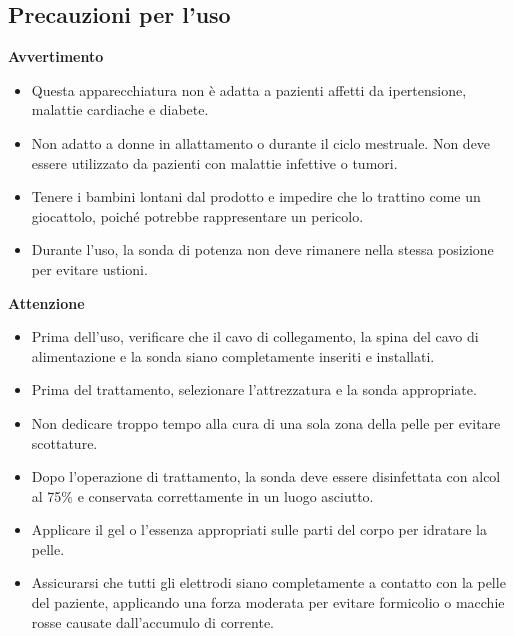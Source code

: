 \documentclass[a4paper]{article}
\begin{document}
\subsection{Precauzioni per l'uso}

\textbf{Avvertimento} \faExclamationTriangle

\begin{itemize}
	\item Questa apparecchiatura non è adatta a pazienti affetti da ipertensione, malattie cardiache e diabete.
	\item Non adatto a donne in allattamento o durante il ciclo mestruale. Non deve essere utilizzato da pazienti con malattie infettive o tumori.
	\item Tenere i bambini lontani dal prodotto e impedire che lo trattino come un giocattolo, poiché potrebbe rappresentare un pericolo.
	\item Durante l'uso, la sonda di potenza non deve rimanere nella stessa posizione per evitare ustioni.
\end{itemize}

\vspace{20pt}

\noindent \textbf{Attenzione} \faExclamationTriangle

\begin{itemize}
  \item Prima dell'uso, verificare che il cavo di collegamento, la spina del cavo di alimentazione e la sonda siano completamente inseriti e installati.
\end{itemize}

\begin{itemize}
	\item Prima del trattamento, selezionare l'attrezzatura e la sonda appropriate.
	\item Non dedicare troppo tempo alla cura di una sola zona della pelle per evitare scottature.
	\item Dopo l'operazione di trattamento, la sonda deve essere disinfettata con alcol al 75\% e conservata correttamente in un luogo asciutto.
	\item Applicare il gel o l'essenza appropriati sulle parti del corpo per idratare la pelle.
	\item Assicurarsi che tutti gli elettrodi siano completamente a contatto con la pelle del paziente, applicando una forza moderata per evitare formicolio o macchie rosse causate dall'accumulo di corrente.
\end{itemize}
\end{document}
